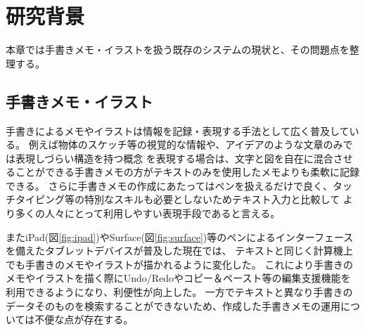 \chapter{研究背景}
\label{chap:haikei}

本章では手書きメモ・イラストを扱う既存のシステムの現状と、その問題点を整理する。

\newpage

\section{手書きメモ・イラスト}
手書きによるメモやイラストは情報を記録・表現する手法として広く普及している。
例えば物体のスケッチ等の視覚的な情報や、アイデアのような文章のみでは表現しづらい構造を持つ概念
を表現する場合は、文字と図を自在に混合させることができる手書きメモの方がテキストのみを使用したメモよりも柔軟に記録できる。
さらに手書きメモの作成にあたってはペンを扱えるだけで良く、タッチタイピング等の特別なスキルも必要としないためテキスト入力と比較して
より多くの人々にとって利用しやすい表現手段であると言える。

またiPad(図\ref{fig:ipad})やSurface(図\ref{fig:surface})等のペンによるインターフェースを備えたタブレットデバイスが普及した現在では、
テキストと同じく計算機上でも手書きのメモやイラストが描かれるように変化した。
これにより手書きのメモやイラストを描く際にUndo/Redoやコピー＆ペースト等の編集支援機能を利用できるようになり、利便性が向上した。
一方でテキストと異なり手書きのデータそのものを検索することができないため、作成した手書きメモの運用については不便な点が存在する。

